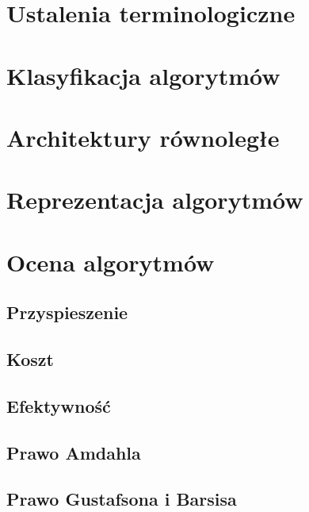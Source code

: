 \section{Ustalenia terminologiczne}


\newpage

\section{Klasyfikacja algorytmów}


\section{Architektury równoległe}


\section{Reprezentacja algorytmów}


\section{Ocena algorytmów}


\subsection{Przyspieszenie}


\subsection{Koszt}


\subsection{Efektywność}


\subsection{Prawo Amdahla}


\subsection{Prawo Gustafsona i Barsisa}


